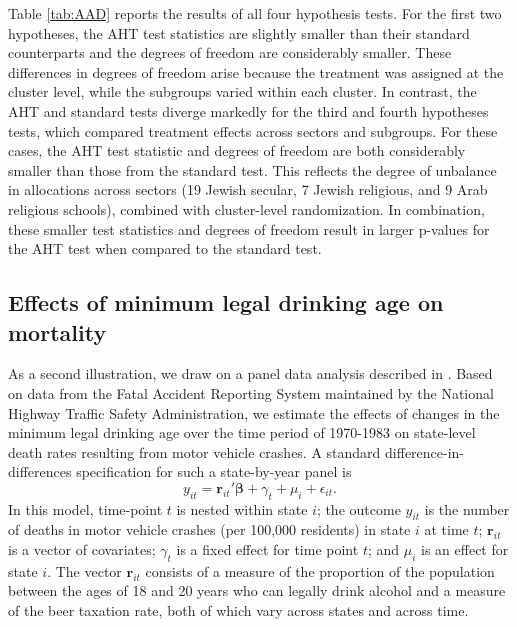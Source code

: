 \documentclass[12pt]{article}\usepackage[]{graphicx}\usepackage[]{color}
\newcommand{\bm}{\mathbf}
\newcommand{\bs}{\boldsymbol}
\begin{document}
Table \ref{tab:AAD} reports the results of all four hypothesis tests. 
For the first two hypotheses, the AHT test statistics are slightly smaller than their standard counterparts and the degrees of freedom are considerably smaller. 
These differences in degrees of freedom arise because the treatment was assigned at the cluster level, while the subgroups varied within each cluster. 
In contrast, the AHT and standard tests diverge markedly for the third and fourth hypotheses tests, which compared treatment effects across sectors and subgroups.
For these cases, the AHT test statistic and degrees of freedom are both considerably smaller than those from the standard test. 
This reflects the degree of unbalance in allocations across sectors (19 Jewish secular, 7 Jewish religious, and 9 Arab religious schools), combined with cluster-level randomization. 
In combination, these smaller test statistics and degrees of freedom result in larger p-values for the AHT test when compared to the standard test.

\subsection{Effects of minimum legal drinking age on mortality} 

As a second illustration, we draw on a panel data analysis described in \citet[see also \citealp{Carpenter2011minimum}]{Angrist2014mastering}.
Based on data from the Fatal Accident Reporting System maintained by the National Highway Traffic Safety Administration, we estimate the effects of changes in the minimum legal drinking age over the time period of 1970-1983 on state-level death rates resulting from motor vehicle crashes.
A standard difference-in-differences specification for such a state-by-year panel is
\begin{equation}
\label{eq:MLDA}
y_{it} = \bm{r}_{it}'\bs\beta + \gamma_t + \mu_i + \epsilon_{it}.
\end{equation}
In this model, time-point $t$ is nested within state $i$; the outcome $y_{it}$ is the number of deaths in motor vehicle crashes (per 100,000 residents) in state $i$ at time $t$; $\bm{r}_{it}$ is a vector of covariates; $\gamma_t$ is a fixed effect for time point $t$; and $\mu_i$ is an effect for state $i$. The vector $\bm{r}_{it}$ consists of a measure of the proportion of the population between the ages of 18 and 20 years who can legally drink alcohol and a measure of the beer taxation rate, both of which vary across states and across time.
\end{document}
